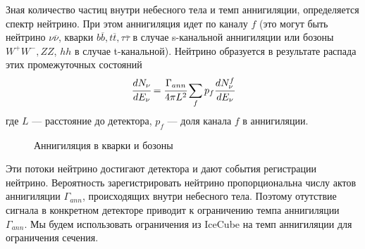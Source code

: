 Зная количество частиц внутри небесного тела и темп аннигиляции, определяется спектр нейтрино. При этом аннигиляция идет по каналу $f$ (это могут быть нейтрино $\nu\overline{\nu}$, кварки $b\overline{b}, t\overline{t}, \tau\overline{\tau}$ в случае s-канальной аннигиляции или бозоны $W^+W^-, ZZ$, $hh$ в случае t-канальной). Нейтрино образуется в результате распада этих промежуточных состояний \cite{CIRELLI2008338}
\begin{equation}
	\cfrac{d N_{\nu}}{d E_{\nu}} = \cfrac{\Gamma_{ann}}{4\pi L^2} \sum_f{p_f \cfrac{d N^f_{\nu}}{d E_{\nu}}}
\end{equation}
где $L$ --- расстояние до детектора, $p_f$ --- доля канала $f$ в аннигиляции.

\begin{figure}[!h]
	\centering
	\begin{subfigure}[b!]{0.3\textwidth}
	\end{subfigure}
	\begin{subfigure}[b!]{0.2\textwidth}
	\end{subfigure}
	\caption {Аннигиляция в кварки и бозоны}
	\label{pic:ann_channels}
\end{figure}

Эти потоки нейтрино достигают детектора и дают события регистрации нейтрино. Вероятность зарегистрировать нейтрино пропорциональна числу актов аннигиляции $\Gamma_{ann}$, происходящих внутри небесного тела. Поэтому отутствие сигнала в конкретном детекторе приводит к ограничению темпа аннигиляции $\Gamma_{ann}$. 
Мы будем использовать ограничения из IceCube \cite{Aartsen_2017} на темп аннигиляции для ограничения сечения.



